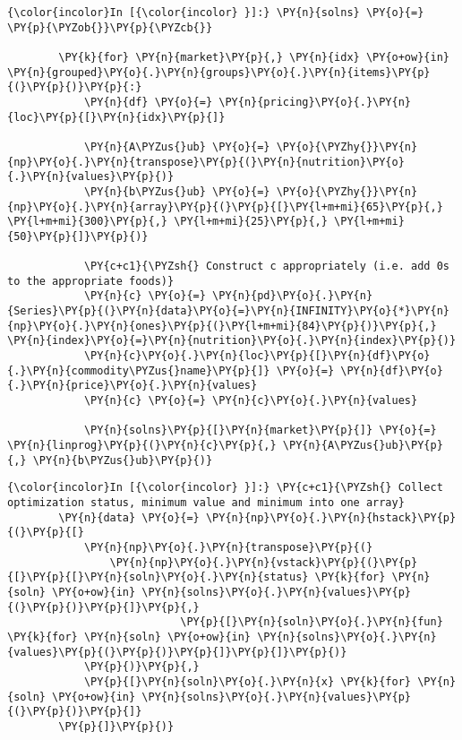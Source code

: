     \begin{Verbatim}[commandchars=\\\{\}]
{\color{incolor}In [{\color{incolor} }]:} \PY{n}{solns} \PY{o}{=} \PY{p}{\PYZob{}}\PY{p}{\PYZcb{}}
        
        \PY{k}{for} \PY{n}{market}\PY{p}{,} \PY{n}{idx} \PY{o+ow}{in} \PY{n}{grouped}\PY{o}{.}\PY{n}{groups}\PY{o}{.}\PY{n}{items}\PY{p}{(}\PY{p}{)}\PY{p}{:}
            \PY{n}{df} \PY{o}{=} \PY{n}{pricing}\PY{o}{.}\PY{n}{loc}\PY{p}{[}\PY{n}{idx}\PY{p}{]}
        
            \PY{n}{A\PYZus{}ub} \PY{o}{=} \PY{o}{\PYZhy{}}\PY{n}{np}\PY{o}{.}\PY{n}{transpose}\PY{p}{(}\PY{n}{nutrition}\PY{o}{.}\PY{n}{values}\PY{p}{)}
            \PY{n}{b\PYZus{}ub} \PY{o}{=} \PY{o}{\PYZhy{}}\PY{n}{np}\PY{o}{.}\PY{n}{array}\PY{p}{(}\PY{p}{[}\PY{l+m+mi}{65}\PY{p}{,} \PY{l+m+mi}{300}\PY{p}{,} \PY{l+m+mi}{25}\PY{p}{,} \PY{l+m+mi}{50}\PY{p}{]}\PY{p}{)}
        
            \PY{c+c1}{\PYZsh{} Construct c appropriately (i.e. add 0s to the appropriate foods)}
            \PY{n}{c} \PY{o}{=} \PY{n}{pd}\PY{o}{.}\PY{n}{Series}\PY{p}{(}\PY{n}{data}\PY{o}{=}\PY{n}{INFINITY}\PY{o}{*}\PY{n}{np}\PY{o}{.}\PY{n}{ones}\PY{p}{(}\PY{l+m+mi}{84}\PY{p}{)}\PY{p}{,} \PY{n}{index}\PY{o}{=}\PY{n}{nutrition}\PY{o}{.}\PY{n}{index}\PY{p}{)}
            \PY{n}{c}\PY{o}{.}\PY{n}{loc}\PY{p}{[}\PY{n}{df}\PY{o}{.}\PY{n}{commodity\PYZus{}name}\PY{p}{]} \PY{o}{=} \PY{n}{df}\PY{o}{.}\PY{n}{price}\PY{o}{.}\PY{n}{values}
            \PY{n}{c} \PY{o}{=} \PY{n}{c}\PY{o}{.}\PY{n}{values}
        
            \PY{n}{solns}\PY{p}{[}\PY{n}{market}\PY{p}{]} \PY{o}{=} \PY{n}{linprog}\PY{p}{(}\PY{n}{c}\PY{p}{,} \PY{n}{A\PYZus{}ub}\PY{p}{,} \PY{n}{b\PYZus{}ub}\PY{p}{)}
\end{Verbatim}


    \begin{Verbatim}[commandchars=\\\{\}]
{\color{incolor}In [{\color{incolor} }]:} \PY{c+c1}{\PYZsh{} Collect optimization status, minimum value and minimum into one array}
        \PY{n}{data} \PY{o}{=} \PY{n}{np}\PY{o}{.}\PY{n}{hstack}\PY{p}{(}\PY{p}{[}
            \PY{n}{np}\PY{o}{.}\PY{n}{transpose}\PY{p}{(}
                \PY{n}{np}\PY{o}{.}\PY{n}{vstack}\PY{p}{(}\PY{p}{[}\PY{p}{[}\PY{n}{soln}\PY{o}{.}\PY{n}{status} \PY{k}{for} \PY{n}{soln} \PY{o+ow}{in} \PY{n}{solns}\PY{o}{.}\PY{n}{values}\PY{p}{(}\PY{p}{)}\PY{p}{]}\PY{p}{,}
                           \PY{p}{[}\PY{n}{soln}\PY{o}{.}\PY{n}{fun} \PY{k}{for} \PY{n}{soln} \PY{o+ow}{in} \PY{n}{solns}\PY{o}{.}\PY{n}{values}\PY{p}{(}\PY{p}{)}\PY{p}{]}\PY{p}{]}\PY{p}{)}
            \PY{p}{)}\PY{p}{,}
            \PY{p}{[}\PY{n}{soln}\PY{o}{.}\PY{n}{x} \PY{k}{for} \PY{n}{soln} \PY{o+ow}{in} \PY{n}{solns}\PY{o}{.}\PY{n}{values}\PY{p}{(}\PY{p}{)}\PY{p}{]}
        \PY{p}{]}\PY{p}{)}
\end{Verbatim}


